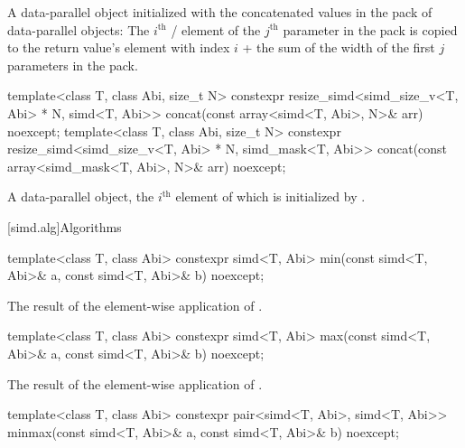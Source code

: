 \begin{itemdescr}
  \pnum\returns
  A data-parallel object initialized with the concatenated values in the  pack of data-parallel objects: The $i^\text{th}$ / element of the $j^\text{th}$ parameter in the  pack is copied to the return value's element with index $i$ + the sum of the width of the first $j$ parameters in the  pack.
\end{itemdescr}

\begin{itemdecl}
  template<class T, class Abi, size_t N>
    constexpr resize_simd<simd_size_v<T, Abi> * N, simd<T, Abi>>
      concat(const array<simd<T, Abi>, N>& arr) noexcept;
  template<class T, class Abi, size_t N>
    constexpr resize_simd<simd_size_v<T, Abi> * N, simd_mask<T, Abi>>
      concat(const array<simd_mask<T, Abi>, N>& arr) noexcept;
\end{itemdecl}

\begin{itemdescr}
  \pnum\returns
  A data-parallel object, the $i^\text{th}$ element of which is initialized by .
\end{itemdescr}

[simd.alg]{Algorithms}

\begin{itemdecl}
template<class T, class Abi> constexpr simd<T, Abi> min(const simd<T, Abi>& a, const simd<T, Abi>& b) noexcept;
\end{itemdecl}

\begin{itemdescr}
  \pnum\returns
  The result of the element-wise application of  \foralli.
\end{itemdescr}

\begin{itemdecl}
template<class T, class Abi> constexpr simd<T, Abi> max(const simd<T, Abi>& a, const simd<T, Abi>& b) noexcept;
\end{itemdecl}

\begin{itemdescr}
  \pnum\returns
  The result of the element-wise application of  \foralli.
\end{itemdescr}

\begin{itemdecl}
template<class T, class Abi>
  constexpr pair<simd<T, Abi>, simd<T, Abi>> minmax(const simd<T, Abi>& a, const simd<T, Abi>& b) noexcept;
\end{itemdecl}

